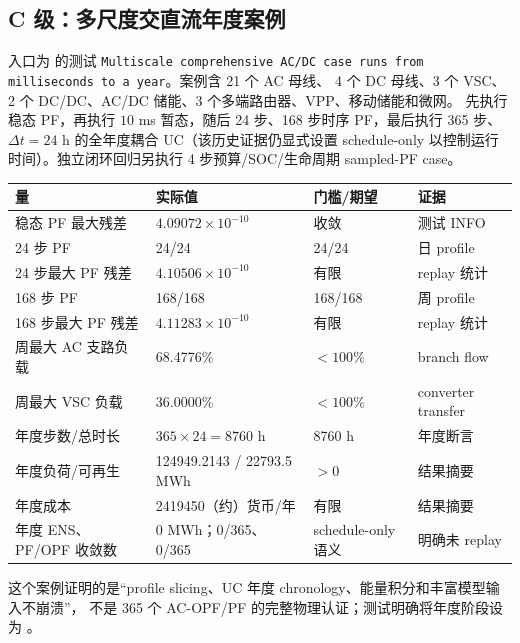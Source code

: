 \subsection{C 级：多尺度交直流年度案例}
入口为  的测试
\texttt{Multiscale comprehensive AC/DC case runs from milliseconds to a year}。案例含 21 个 AC 母线、
4 个 DC 母线、3 个 VSC、2 个 DC/DC、AC/DC 储能、3 个多端路由器、VPP、移动储能和微网。
先执行稳态 PF，再执行 $10$ ms 暂态，随后 24 步、168 步时序 PF，最后执行 365 步、$\Delta t=24$ h
的全年度耦合 UC（该历史证据仍显式设置 schedule-only 以控制运行时间）。独立闭环回归另执行
4 步预算/SOC/生命周期 sampled-PF case。

\begin{center}\footnotesize
\begin{tabular}{@{}L{4.3cm}L{3.3cm}L{2.8cm}L{3.9cm}@{}}
\toprule
量 & 实际值 & 门槛/期望 & 证据\\ \midrule
稳态 PF 最大残差 & $4.09072\times10^{-10}$ & 收敛 & 测试 INFO\\
24 步 PF & 24/24 & 24/24 & 日 profile\\
24 步最大 PF 残差 & $4.10506\times10^{-10}$ & 有限 & replay 统计\\
168 步 PF & 168/168 & 168/168 & 周 profile\\
168 步最大 PF 残差 & $4.11283\times10^{-10}$ & 有限 & replay 统计\\
周最大 AC 支路负载 & 68.4776\% & $<100\%$ & branch flow\\
周最大 VSC 负载 & 36.0000\% & $<100\%$ & converter transfer\\
年度步数/总时长 & $365\times24=8760$ h & 8760 h & 年度断言\\
年度负荷/可再生 & 124949.2143 / 22793.5 MWh & $>0$ & 结果摘要\\
年度成本 & 2419450（约）货币/年 & 有限 & 结果摘要\\
年度 ENS、PF/OPF 收敛数 & 0 MWh；0/365、0/365 & schedule-only 语义 & 明确未 replay\\
\bottomrule
\end{tabular}
\end{center}
这个案例证明的是“profile slicing、UC 年度 chronology、能量积分和丰富模型输入不崩溃”，
不是 365 个 AC-OPF/PF 的完整物理认证；测试明确将年度阶段设为 。

